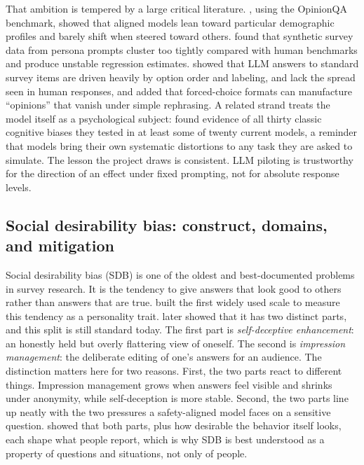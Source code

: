 \documentclass[14pt,a4paper]{extarticle}
\begin{document}
That ambition is tempered by a large critical literature. \textcite{santurkar2023}, using the OpinionQA benchmark, showed that aligned models lean toward particular demographic profiles and barely shift when steered toward others. \textcite{bisbee2024} found that synthetic survey data from persona prompts cluster too tightly compared with human benchmarks and produce unstable regression estimates. \textcite{dominguez2024} showed that LLM answers to standard survey items are driven heavily by option order and labeling, and lack the spread seen in human responses, and \textcite{rottger2024} added that forced-choice formats can manufacture ``opinions'' that vanish under simple rephrasing. A related strand treats the model itself as a psychological subject: \textcite{malberg2025} found evidence of all thirty classic cognitive biases they tested in at least some of twenty current models, a reminder that models bring their own systematic distortions to any task they are asked to simulate. The lesson the project draws is consistent. LLM piloting is trustworthy for the direction of an effect under fixed prompting, not for absolute response levels.

\subsection{Social desirability bias: construct, domains, and mitigation}

Social desirability bias (SDB) is one of the oldest and best-documented problems in survey research. It is the tendency to give answers that look good to others rather than answers that are true. \textcite{crowne1960} built the first widely used scale to measure this tendency as a personality trait. \textcite{paulhus1984} later showed that it has two distinct parts, and this split is still standard today. The first part is \emph{self-deceptive enhancement}: an honestly held but overly flattering view of oneself. The second is \emph{impression management}: the deliberate editing of one's answers for an audience. The distinction matters here for two reasons. First, the two parts react to different things. Impression management grows when answers feel visible and shrinks under anonymity, while self-deception is more stable. Second, the two parts line up neatly with the two pressures a safety-aligned model faces on a sensitive question. \textcite{randallFernandes1991} showed that both parts, plus how desirable the behavior itself looks, each shape what people report, which is why SDB is best understood as a property of questions and situations, not only of people.
\end{document}
